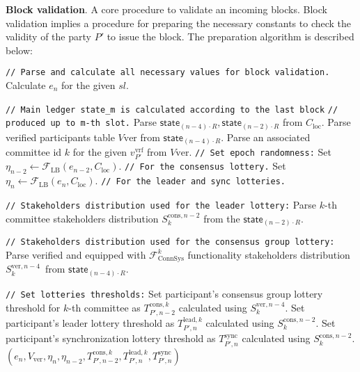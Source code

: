 \textbf{Block validation}.\label{apndx:prepare-block-validation}
A core procedure to validate an incoming blocks.
Block validation implies a procedure for preparing the necessary constants to check the validity of the party $P'$ to issue the block.
The preparation algorithm is described below:
\begin{algo}
    \caption{$\textsf{PrepareForBlockValidation}(sl, R, v_{P'}^{\text{vrf}}, C_{\text{loc}})$}
    \begin{algorithmic}[1]
        \noindent
        \lstinline|// Parse and calculate all necessary values for block validation.|
        \State Calculate $e_n$ for the given $sl$.

        \noindent
        \lstinline|// Main ledger state_m is calculated according to the last block|
        \noindent
        \lstinline|// produced up to m-th slot.|
        \State Parse $\textsf{state}_{(n - 4)\cdot R},
        \textsf{state}_{(n - 2)\cdot R}$ from $C_{\text{loc}}$.
        \State Parse verified participants table $V{\text{ver}}$ from $\textsf{state}_{(n - 4)\cdot R}$.
        \State Parse an associated committee id $k$ for the given $v_{P'}^{\text{vrf}}$ from $V{\text{ver}}$.
        \noindent
        \lstinline|// Set epoch randomness:|
        \State Set ${\eta_{n-2} \leftarrow \mathcal{F}_{\text{LB}}(e_{n-2}, C_{\text{loc}})}$. \lstinline|// For the consensus lottery.|
        \State Set ${\eta_{n} \leftarrow \mathcal{F}_{\text{LB}}(e_{n}, C_{\text{loc}})}$. \lstinline|// For the leader and sync lotteries.|

        \noindent
        \lstinline|// Stakeholders distribution used for the leader lottery:|
        \State Parse $k$-th committee stakeholders distribution $S_k^{\text{cons}, n - 2}$ from the $\textsf{state}_{(n - 2)\cdot R}$.

        \noindent
        \lstinline|// Stakeholders distribution used for the consensus group lottery:|
        \State Parse verified and equipped with $\mathcal{F}^k_{\text{ConnSys}}$ functionality stakeholders distribution $S_k^{\text{ver}, {n - 4}}$\
        from $\textsf{state}_{(n - 4)\cdot R}$.

        \noindent
        \lstinline|// Set lotteries thresholds:|
        \State Set participant's consensus group lottery threshold for $k$-th committee as $T_{P', n-2}^{\text{cons}, k}$ calculated using $S_k^{\text{ver}, {n - 4}}$.
        \State Set participant's leader lottery threshold as $T_{P', n}^{\text{lead}, k}$ calculated using $S_k^{\text{cons}, {n - 2}}$.
        \State Set participant's synchronization lottery threshold as $T_{P', n}^{\text{sync}}$ calculated using $S_k^{\text{cons}, {n - 2}}$.
        \State \Return ${(e_n, V_{\text{ver}}, \eta_{n}, \eta_{n - 2}, T_{P', n-2}^{\text{cons}, k}, T_{P', n}^{\text{lead}, k}, T_{P', n}^{\text{sync}})}$
    \end{algorithmic}\label{alg:prepare-block-validation}
\end{algo}


